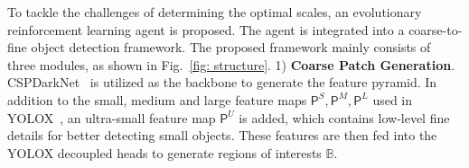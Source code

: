 \documentclass[letterpaper]{article} %
\newcommand\blue[1]{\textcolor{blue}{#1}}
\newcommand\rjf[1]{\textcolor{red}{\{RJF: #1\}}}
\begin{document}
To tackle the challenges of determining the optimal scales,
an evolutionary reinforcement learning agent is proposed. The agent is integrated into a coarse-to-fine object detection framework. The proposed framework mainly consists of three modules, as shown in Fig.~\ref{fig: structure}.
1) \textbf{Coarse Patch Generation}. %
CSPDarkNet~\cite{Wang_2021_ScaledYOLOv4} is utilized as the backbone to generate the feature pyramid. %
In addition to the small, medium and large feature maps $\bm{\mathsf{P}}^S,\bm{\mathsf{P}}^M,\bm{\mathsf{P}}^L$ used in YOLOX~\cite{Ge_2021_YOLOX}, an ultra-small feature map $\bm{\mathsf{P}}^{U}$ is added, which contains low-level fine details for better detecting small objects.
These features are then fed into the YOLOX decoupled heads to generate regions of interests $\mathbb{B}$. %
\end{document}

